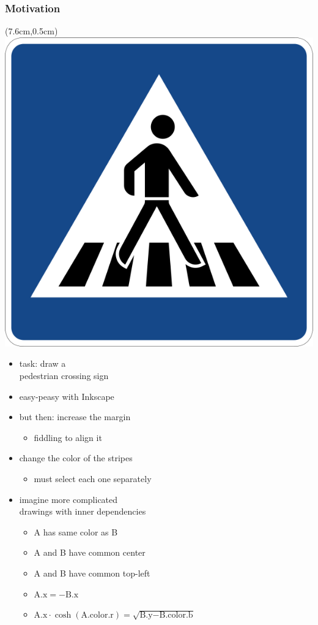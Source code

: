 \documentclass{beamer}
\begin{document}
  \begin{frame}[t]\frametitle{Motivation}
    \begin{textblock*}{5cm}(7.6cm,0.5cm) %
      \includegraphics[width=\textwidth]{media/601px-Zeichen_350-20_-_Fußgängerüberweg_(Linksaufstellung)_einseitig,_StVO_1992.png}
    \end{textblock*}
    \begin{itemize}
        \item task: draw a \\pedestrian crossing sign
        \item easy-peasy with Inkscape
        \item but then: increase the margin
        \begin{itemize}
           \item fiddling to align it
        \end{itemize}
        \item change the color of the stripes
        \begin{itemize}
          \item must select each one separately
        \end{itemize}
        \item imagine more complicated \\
        drawings with inner dependencies
        \begin{itemize}
          \item A has same color as B
          \item A and B have common center
          \item A and B have common top-left
          \item $\text{A.x} = -\text{B.x}$
          \item $\text{A.x}\cdot\cosh({\text{A.color.r}}) = \sqrt{\text{B.y} - \text{B.color.b}}$
        \end{itemize}
      \end{itemize}  
  \end{frame}
\end{document}
